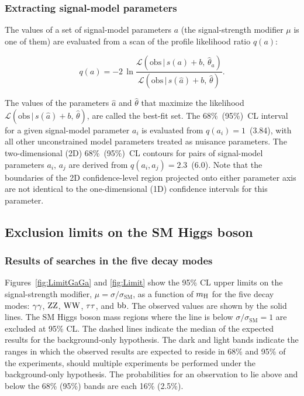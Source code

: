 \documentclass[11pt,twoside,a4paper,cmspaper,final,collab]{cms-tdr}
\begin{document}
\subsubsection{Extracting signal-model parameters}



The values of a set of signal-model parameters $a$ (the signal-strength modifier $\mu$ is one of them)
are evaluated from a scan of the profile likelihood ratio $q(a)$:



\begin{equation}
q(a) = - 2 \, \ln \frac {\mathcal{L}(\text{obs} \, | \, s(a) + b,      \, \hat \theta_{a} ) }
                      {\mathcal{L}(\text{obs} \, | \, s(\hat a) + b, \, \hat \theta ) } .
\end{equation}

The values of the parameters $\hat a$ and $\hat \theta$
that maximize the likelihood
$\mathcal{L}(\text{obs} \, | \, s(\hat a) + b, \, \hat \theta )$,
are called the best-fit set.
The 68\%~(95\%)~CL interval for a given signal-model parameter $a_i$ is evaluated from $q(a_i)=1$~(3.84),
with all other unconstrained model parameters treated as nuisance parameters.
The two-dimensional (2D) 68\%~(95\%)~CL contours for pairs of signal-model parameters $a_i,\, a_j$ are derived
from $q(a_i, a_j) = 2.3$~(6.0).
Note that the boundaries of the 2D confidence-level region projected onto
either parameter axis are not identical to the one-dimensional (1D) confidence intervals for this parameter.





\subsection{Exclusion limits on the SM Higgs boson}

\subsubsection{Results of searches in the five decay modes}
\label{sec:SubchannelLimits}

Figures~\ref{fig:LimitGaGa} and \ref{fig:Limit}
show the 95\% CL upper limits on the signal-strength modifier,
$\mu = \sigma / \sigma_{\mathrm{SM}}$,
as a function of $m_{\mathrm{H}}$ for the five decay modes:
$\gamma\gamma$, $\mathrm{Z}\mathrm{Z}$, $\mathrm{W}\mathrm{W}$, $\tau\tau$, and $\mathrm{b}\mathrm{b}$.
The observed values are shown by the solid lines.
The SM Higgs boson mass regions where the line is below $\sigma / \sigma_{\mathrm{SM}}= 1$ are excluded at 95\% CL.
The dashed lines indicate the median of the expected results for
the background-only hypothesis. The dark  and light bands
indicate the ranges in which
the observed results are expected to reside in
68\% and 95\% of the experiments, should multiple experiments be performed under the background-only hypothesis.
The probabilities for an observation to lie above and below the 68\% (95\%) bands are each 16\% (2.5\%).
\end{document}
